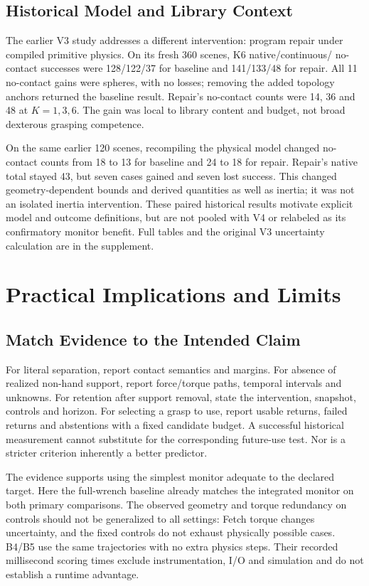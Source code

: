 \documentclass[conference,10pt,letterpaper]{IEEEtran}
\begin{document}
\subsection{Historical Model and Library Context}
\label{sec:history}
The earlier V3 study addresses a different intervention: program repair under
compiled primitive physics. On its fresh 360 scenes, K6 native/continuous/
no-contact successes were 128/122/37 for baseline and 141/133/48 for repair.
All 11 no-contact gains were spheres, with no losses; removing the added
topology anchors returned the baseline result. Repair's no-contact counts
were 14, 36 and 48 at $K=1,3,6$. The gain was local to library content and
budget, not broad dexterous grasping competence.

On the same earlier 120 scenes, recompiling the physical model changed
no-contact counts from 18 to 13 for baseline and 24 to 18 for repair. Repair's
native total stayed 43, but seven cases gained and seven lost success. This
changed geometry-dependent bounds and derived quantities as well as inertia;
it was not an isolated inertia intervention. These paired historical results
motivate explicit model and outcome definitions, but are not pooled with V4
or relabeled as its confirmatory monitor benefit. Full tables and the original
V3 uncertainty calculation are in the supplement.

\section{Practical Implications and Limits}
\subsection{Match Evidence to the Intended Claim}
For literal separation, report contact semantics and margins. For absence of
realized non-hand support, report force/torque paths, temporal intervals and
unknowns. For retention after support removal, state the intervention,
snapshot, controls and horizon. For selecting a grasp to use, report usable
returns, failed returns and abstentions with a fixed candidate budget. A
successful historical measurement cannot substitute for the corresponding
future-use test. Nor is a stricter criterion inherently a better predictor.

The evidence supports using the simplest monitor adequate to the declared
target. Here the full-wrench baseline already matches the integrated monitor
on both primary comparisons. The observed geometry and torque redundancy on
controls should not be generalized to all settings: Fetch torque changes
uncertainty, and the fixed controls do not exhaust physically possible cases.
B4/B5 use the same trajectories with no extra physics steps. Their recorded
millisecond scoring times exclude instrumentation, I/O and simulation and do
not establish a runtime advantage.
\end{document}
